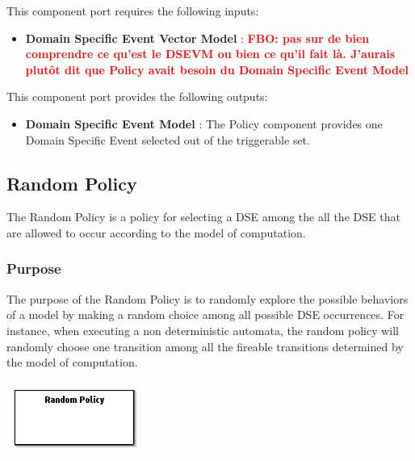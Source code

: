 \documentclass{gemoc} %
\begin{document}
This component port requires the following inputs:
\begin{itemize}
  \item \textbf{Domain Specific Event Vector Model} :
\textbf{\textcolor{red}{FBO: pas sur de bien comprendre ce qu'est le DSEVM ou bien ce qu'il fait l\`a. J'aurais plut\^ot dit que Policy avait besoin du Domain Specific Event Model}}
\end{itemize}

This component port provides the following outputs:
\begin{itemize}
  \item \textbf{Domain Specific Event Model} :
The Policy component provides one Domain Specific Event selected out of the triggerable set.
\end{itemize}


\subsection{Random Policy}
The Random Policy is a policy for selecting a DSE among the all the DSE that are allowed to occur according to the model of computation.

\subsubsection{Purpose}
The purpose of the Random Policy is to randomly explore the possible behaviors of a model by making a random choice among all possible DSE occurrences. For instance, when executing a non deterministic automata, the random policy will randomly choose one transition among all the fireable transitions determined by the model of computation.

\begin{center}
\includegraphics*[trim=0.0cm 0.0cm 0cm 0.0cm, clip=true]{../images/generated/Generated_Random_Policy.png}
\end{center}
\end{document}
